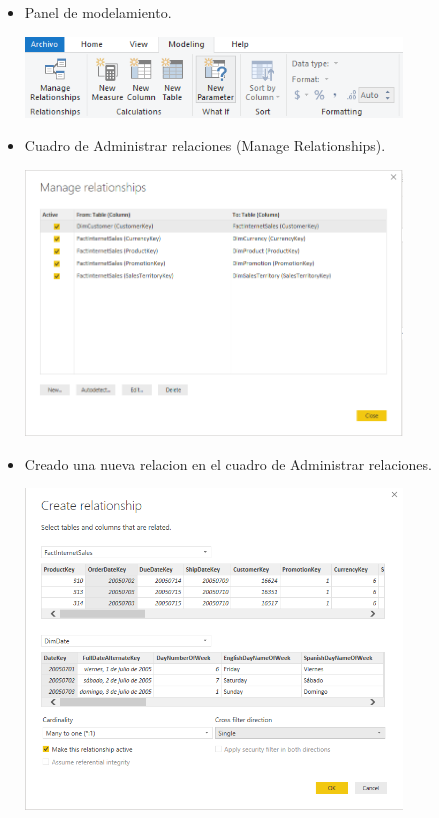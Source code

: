 \begin{itemize}
	\item  Panel de modelamiento.
	\begin{center}
	\includegraphics[width=10cm]{./Imagenes/Captura3} 
	\end{center}
\end{itemize} 

\begin{itemize}
	\item Cuadro de Administrar relaciones (Manage Relationships).
	\begin{center}
	\includegraphics[width=10cm]{./Imagenes/Captura4} 
	\end{center}
\end{itemize} 

\begin{itemize}
	\item Creado una nueva relacion en el cuadro de Administrar relaciones.
	\begin{center}
	\includegraphics[width=10cm]{./Imagenes/Captura5} 
	\end{center}
\end{itemize} 

